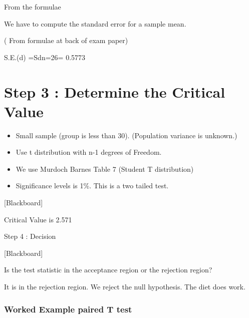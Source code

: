 \documentclass[]{report}
\begin{document}
From the formulae

We have to compute the standard error for a sample mean. 

( From formulae at back of exam paper)

S.E.(d) =Sdn=26= 0.5773 





\section{Step 3 :  Determine the Critical Value}

\begin{itemize}
\item Small sample (group is less than 30).
(Population variance is unknown.)

\item Use t distribution with n-1 degrees of Freedom.

\item We use Murdoch Barnes Table 7 (Student T distribution)

\item Significance levels is 1\%.  This is a two tailed test.

\end{itemize}

[Blackboard]


Critical Value is 2.571


Step 4 : Decision


[Blackboard]

Is the test statistic in the acceptance region or the rejection region?

It is in the rejection region. We reject the null hypothesis. The diet does work.

\subsubsection{Worked Example paired T test}
\end{document}
